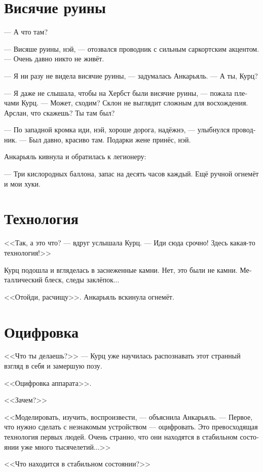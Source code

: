 \documentclass[a4paper,10pt,fleqn]{book}\usepackage{polyglossia}\setdefaultlanguage[babelshorthands=true]{russian}\setotherlanguage{english}\defaultfontfeatures{Ligatures=TeX,Mapping=tex-text}\usepackage{xcolor}\newcommand{\ml}[3]{#2}
\begin{document}
\section{Висячие руины}

--- А что там?

--- Висяше руины, нэй, --- отозвался проводник с сильным саркортским акцентом.
--- Очень давно никто не живёт.

--- Я ни разу не видела висячие руины, --- задумалась Анкарьяль.
--- А ты, Курц?

--- Я даже не слышала, чтобы на Хербст были висячие руины, --- пожала плечами Курц.
--- Может, сходим?
Склон не выглядит сложным для восхождения.
Арслан, что скажешь?
Ты там был?

--- По западной кромка иди, нэй, хороше дорога, надёжнэ, --- улыбнулся проводник.
--- Был давно, красиво там.
Подарки жене принёс, нэй.

Анкарьяль кивнула и обратилась к легионеру:

--- Три кислородных баллона, запас на десять часов каждый.
Ещё ручной огнемёт и мои хуки.

\section{Технология}

<<Так, а это что? --- вдруг услышала Курц.
--- Иди сюда срочно!
Здесь какая-то технология!>>

Курц подошла и вгляделась в заснеженные камни.
Нет, это были не камни.
Металлический блеск, следы заклёпок...

<<Отойди, расчищу>>.
Анкарьяль вскинула огнемёт.

\section{Оцифровка}

<<Что ты делаешь?>> --- Курц уже научилась распознавать этот странный взгляд в себя и замершую позу.

<<Оцифровка аппарата>>.

<<Зачем?>>

<<Моделировать, изучить, воспроизвести, --- объяснила Анкарьяль.
--- Первое, что нужно сделать с незнакомым устройством --- оцифровать.
Это превосходящая технология первых людей.
Очень странно, что они находятся в стабильном состоянии уже много тысячелетий...>>

<<Что находится в стабильном состоянии?>>
\end{document}
